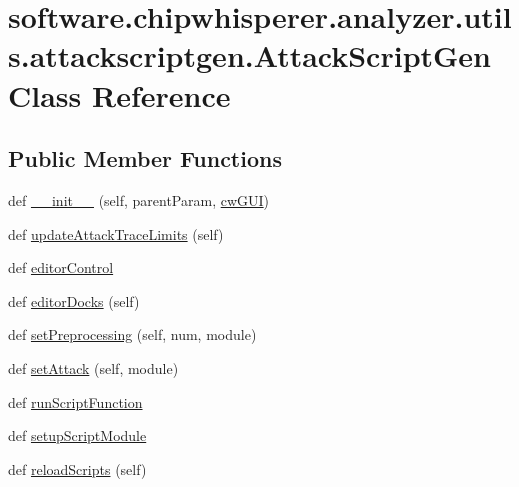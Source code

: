 \hypertarget{classsoftware_1_1chipwhisperer_1_1analyzer_1_1utils_1_1attackscriptgen_1_1AttackScriptGen}{}\section{software.\+chipwhisperer.\+analyzer.\+utils.\+attackscriptgen.\+Attack\+Script\+Gen Class Reference}
\label{classsoftware_1_1chipwhisperer_1_1analyzer_1_1utils_1_1attackscriptgen_1_1AttackScriptGen}
\subsection*{Public Member Functions}
\begin{DoxyCompactItemize}
\item 
def \hyperlink{classsoftware_1_1chipwhisperer_1_1analyzer_1_1utils_1_1attackscriptgen_1_1AttackScriptGen_a6d447e815d9a0cb346eefdebb4068e32}{\+\_\+\+\_\+init\+\_\+\+\_\+} (self, parent\+Param, \hyperlink{classsoftware_1_1chipwhisperer_1_1analyzer_1_1utils_1_1attackscriptgen_1_1AttackScriptGen_a57daf9081012e7eb81420d6d9c2b80a5}{cw\+G\+U\+I})
\item 
def \hyperlink{classsoftware_1_1chipwhisperer_1_1analyzer_1_1utils_1_1attackscriptgen_1_1AttackScriptGen_ad174a61a310ea81c650291d48ef9da45}{update\+Attack\+Trace\+Limits} (self)
\item 
def \hyperlink{classsoftware_1_1chipwhisperer_1_1analyzer_1_1utils_1_1attackscriptgen_1_1AttackScriptGen_ab4dac8470d4d10298f74558117374199}{editor\+Control}
\item 
def \hyperlink{classsoftware_1_1chipwhisperer_1_1analyzer_1_1utils_1_1attackscriptgen_1_1AttackScriptGen_a60f541b035fc81d6771b07198e4a3786}{editor\+Docks} (self)
\item 
def \hyperlink{classsoftware_1_1chipwhisperer_1_1analyzer_1_1utils_1_1attackscriptgen_1_1AttackScriptGen_aa9120596ae08b27e69a47d4e7088a203}{set\+Preprocessing} (self, num, module)
\item 
def \hyperlink{classsoftware_1_1chipwhisperer_1_1analyzer_1_1utils_1_1attackscriptgen_1_1AttackScriptGen_ab54b892cec48dad1cc9967a59e5bc723}{set\+Attack} (self, module)
\item 
def \hyperlink{classsoftware_1_1chipwhisperer_1_1analyzer_1_1utils_1_1attackscriptgen_1_1AttackScriptGen_a82bcc4aaf8ef4d23bb4ba9e90d1ef3e9}{run\+Script\+Function}
\item 
def \hyperlink{classsoftware_1_1chipwhisperer_1_1analyzer_1_1utils_1_1attackscriptgen_1_1AttackScriptGen_ab7152580aab5caaa8fcf9eebddf41671}{setup\+Script\+Module}
\item 
def \hyperlink{classsoftware_1_1chipwhisperer_1_1analyzer_1_1utils_1_1attackscriptgen_1_1AttackScriptGen_adfdc863b08d0767af9d42e4b4381b6a3}{reload\+Scripts} (self)
\end{DoxyCompactItemize}
